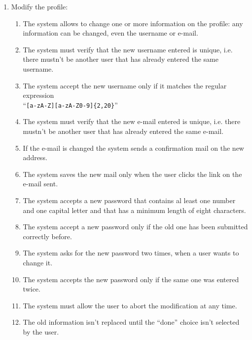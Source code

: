 \begin{enumerate}
\item Modify the profile:
\begin{enumerate}
\item The system allows to change one or more information on the profile: any information can be changed, even the username or e-mail.
\item The system must verify that the new username entered is unique, i.e. there mustn't be another user that has already entered the same username.  \label{f-modify-usrn1}
\item  The system accept the new username only if it matches the regular expression\\``\texttt{[a-zA-Z][a-zA-Z0-9]\{2,20\}}''   \label{f-modify-usrn2}
\item The system must verify that the new e-mail entered is unique, i.e. there mustn't be another user that has already entered the same e-mail.   \label{f-modify-mail1}
\item If the e-mail is changed the system sends a confirmation mail on the new address.
\item The system saves the new mail only when the user clicks the link on the e-mail sent.   \label{f-modify-mail2}
\item The system accepts a new password that contains al least one number and one capital letter and that has a minimum length of eight characters.   \label{f-modify-pswd1}
\item The system accept a new password only if the old one has been submitted correctly before.  \label{f-modify-pswd2}
\item The system asks for the new password two times, when a user wants to change it.
\item The system accepts the new password only if the same one was entered twice.  \label{f-modify-pswd3}
\item The system must allow the user to abort the modification at any time.
\item The old information isn't  replaced until the ``done'' choice isn't selected by the user.
\end{enumerate}




\end{enumerate}

